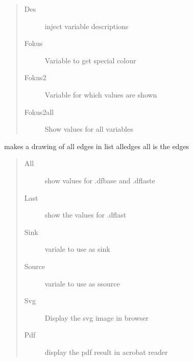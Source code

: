 \documentclass[letterpaper,10pt,english]{sphinxmanual}
\begin{document}
\begin{fulllineitems}
\begin{fulllineitems}
\begin{quote}
\begin{description}
\item[{Des}] \leavevmode
\sphinxAtStartPar
inject variable descriptions

\item[{Fokus}] \leavevmode
\sphinxAtStartPar
Variable to get special colour

\item[{Fokus2}] \leavevmode
\sphinxAtStartPar
Variable for which values are shown

\item[{Fokus2all}] \leavevmode
\sphinxAtStartPar
Show values for all variables

\end{description}\end{quote}

\end{fulllineitems}


\begin{fulllineitems}
\label{\detokenize{core/modelclass:modelclass.Graph_Draw_Mixin.todot2}}
\pysigstartsignatures
{}
\pysigstopsignatures
\sphinxAtStartPar
makes a drawing of all edges in list alledges
all is the edges
\begin{quote}\begin{description}
\item[{All}] \leavevmode
\sphinxAtStartPar
show values for .dfbase and .dflaste

\item[{Last}] \leavevmode
\sphinxAtStartPar
show the values for .dflast

\item[{Sink}] \leavevmode
\sphinxAtStartPar
variale to use as sink

\item[{Source}] \leavevmode
\sphinxAtStartPar
variale to use as ssource

\item[{Svg}] \leavevmode
\sphinxAtStartPar
Display the svg image in browser

\item[{Pdf}] \leavevmode
\sphinxAtStartPar
display the pdf result in acrobat reader


\end{description}
\end{quote}
\end{fulllineitems}
\end{fulllineitems}
\end{document}
